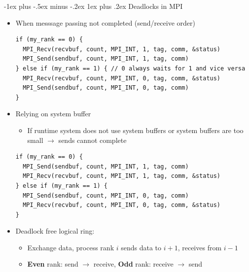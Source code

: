 \documentclass[10pt,landscape]{article}
\makeatletter
\renewcommand{\subsubsection}{\@startsection{subsubsection}{3}{0mm}%
                                {-1ex plus -.5ex minus -.2ex}%
                                {1ex plus .2ex}%
                                {\normalfont\small\bfseries}}
\makeatother
\begin{document}
\begin{multicols*}{3}
\subsubsection{Deadlocks in MPI}
\begin{itemize}[topsep=0pt,noitemsep,wide=0pt, leftmargin=\dimexpr{} + 2\relax]
    \item When messsage passing not completed (send/receive order)
    \begin{lstlisting}[basicstyle = \tiny\ttfamily]
if (my_rank == 0) {
  MPI_Recv(recvbuf, count, MPI_INT, 1, tag, comm, &status)
  MPI_Send(sendbuf, count, MPI_INT, 1, tag, comm)
} else if (my_rank == 1) { // 0 always waits for 1 and vice versa
  MPI_Recv(recvbuf, count, MPI_INT, 0, tag, comm, &status)
  MPI_Send(sendbuf, count, MPI_INT, 0, tag, comm)    
}
    \end{lstlisting}
    \item Relying on system buffer
    \begin{itemize}[topsep=0pt,noitemsep,wide=0pt, leftmargin=\dimexpr{} + 2\relax]
        \item If runtime system does not use system buffers or system buffers are too small $\rightarrow$ sends cannot complete
    \end{itemize}
    \begin{lstlisting}[basicstyle = \tiny\ttfamily]
if (my_rank == 0) {
  MPI_Send(sendbuf, count, MPI_INT, 1, tag, comm)
  MPI_Recv(recvbuf, count, MPI_INT, 1, tag, comm, &status)
} else if (my_rank == 1) { 
  MPI_Send(sendbuf, count, MPI_INT, 0, tag, comm)    
  MPI_Recv(recvbuf, count, MPI_INT, 0, tag, comm, &status)
}
    \end{lstlisting}
    \item Deadlock free logical ring:
    \begin{itemize}[topsep=0pt,noitemsep,wide=0pt, leftmargin=\dimexpr{} + 2\relax]
        \item Exchange data, process rank $i$ sends data to $i+1$, receives from $i-1$
        \item \textbf{Even} rank: send $\rightarrow$ receive, \textbf{Odd} rank: receive $\rightarrow$ send
    \end{itemize}
\end{itemize}


\end{multicols*}
\end{document}
